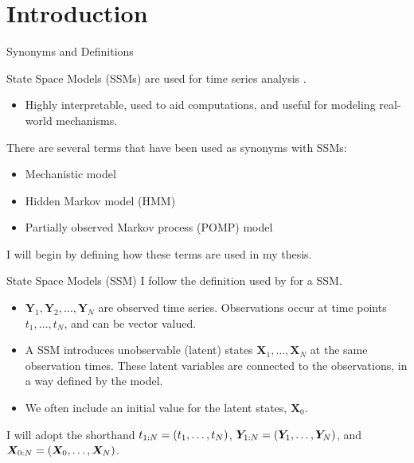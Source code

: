 \documentclass[aspectratio=169]{beamer}\usepackage[]{graphicx}\usepackage[]{xcolor}
\begin{document}
\section{Introduction}

\begin{frame}{Synonyms and Definitions}

State Space Models (SSMs) are used for time series analysis \citep{durbin12}.

\begin{itemize}
  \item Highly interpretable, used to aid computations, and useful for modeling real-world mechanisms.
\end{itemize}

There are several terms that have been used as synonyms with SSMs:

\begin{itemize}
  \item Mechanistic model
  \item Hidden Markov model (HMM)
  \item Partially observed Markov process (POMP) model
\end{itemize}

I will begin by defining how these terms are used in my thesis.

\end{frame}

\begin{frame}{State Space Models (SSM)}
  I follow the definition used by \citet{durbin12} for a SSM.
  
  \begin{itemize}
  \item $\bm{Y}_{1}, \bm{Y}_2, \ldots, \bm{Y}_{N}$ are observed time series. 
  Observations occur at time points $t_1, \ldots, t_N$, and can be vector valued. 
  \item A SSM introduces unobservable (latent) states $\bm{X}_1, \ldots, \bm{X}_N$ at the same observation times.
  These latent variables are connected to the observations, in a way defined by the model.
  \item We often include an initial value for the latent states, $\bm{X}_0$.
  \end{itemize}
  
  I will adopt the shorthand $t_{{1}:{N}} = (t_1, \ldots, t_N)$, $\bm{Y}_{{1}:{N}} = (\bm{Y}_{1}, \ldots, \bm{Y}_{N})$, and $\bm{X}_{{0}:{N}} = (\bm{X}_0, \ldots, \bm{X}_N)$.

\end{frame}
\end{document}
